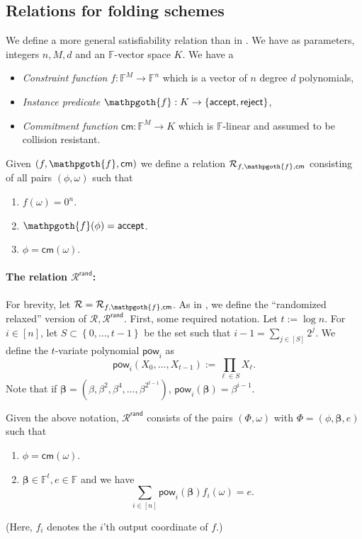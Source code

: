 \documentclass[11pt]{article} %
\newcommand{\F}{\ensuremath{\mathbb F}\xspace}
\newcommand{\cm}{\ensuremath{\mathsf{cm}}\xspace}
\newcommand{\rej}{\ensuremath{\mathsf{reject}}\xspace}
\newcommand{\acc}{\ensuremath{\mathsf{accept}}\xspace}
\newcommand{\defeq}{:=}
\newcommand{\inst}{\ensuremath{\phi}\xspace}
\newcommand{\wit}{\ensuremath{\mathsf{\omega}}\xspace}
\newcommand{\rel}{\ensuremath{\mathcal{R}}\xspace}
\newcommand{\relrand}{\ensuremath{\mathcal{R^{\mathsf{rand}}}}\xspace}
\newcommand{\set}[1]{\ensuremath{\left\{#1\right\}}\xspace}
\newcommand{\sumi}[1]{\sum_{i\in[#1]}}
\newcommand{\sumj}[1]{\sum_{j\in[#1]}}
\newcommand{\betaa}{\ensuremath{\mathbf{\boldsymbol{\beta}}}\xspace}
\newcommand{\insttbase}{\ensuremath{\Phi}\xspace}
\newcommand{\pow}{\ensuremath{\mathsf{pow}}\xspace}
\newcommand{\predinst}{\ensuremath{\mathpgoth{f}}\xspace}
\begin{document}
\subsection{Relations for folding schemes}
We define a more general satisfiability relation than in \cite{protogal}.
We have as parameters, integers $n,M,d$ and an $\F$-vector space $K$.
We have a
\begin{itemize}
 \item \emph{Constraint function} $f:\F^M\to \F^n$ which is a vector of $n$ degree $d$ polynomials,
\item \emph{Instance predicate} $\predinst:K \to \set{\acc,\rej}$,
\item \emph{Commitment function} $\cm:\F^M \to K$ which is $\F$-linear and assumed
to be collision resistant.
\end{itemize}

Given $(f,\predinst,\cm)$ we define a relation $\rel_{f,\predinst,\cm}$ consisting of all pairs
$(\inst,\wit)$ such that
\begin{enumerate}
 \item $f(\wit)=0^n$.
 \item $\predinst(\inst)=\acc$.
 \item $\inst=\cm(\wit)$.
\end{enumerate}

\paragraph{The relation $\relrand$:}
 For brevity, let $\rel=\rel_{f,\predinst,\cm}$.
  As in \cite{protogal}, we define the ``randomized relaxed'' version of $\rel, \relrand$. First, some required notation.
 Let $t\defeq \log n$. For $i\in [n]$, let $S\subset \set{0,\ldots,t-1}$ be the set such that $i-1=\sumj{S}2^j$. We define the $t$-variate polynomial $\pow_i$ as
 \[\pow_i(X_0,\ldots,X_{t-1}) \defeq \prod_{\ell\in S} X_\ell.\]
 Note that if $\betaa=(\beta,\beta^2,\beta^4,\ldots,\beta^{2^{t-1}})$, $\pow_i(\betaa)=\beta^{i-1}$.
  
  Given the above notation, $\relrand$ consists of the pairs $( \insttbase,\wit)$ with $\insttbase=(\inst,\betaa,e)$ such that
 \begin{enumerate}
  \item $\inst=\cm(\wit)$.
  \item $\betaa\in \F^t, e\in \F$ and we have 
  \[\sumi{n}\pow_{i}(\betaa) f_i(\wit) = e.\]
 \end{enumerate}
(Here, $f_i$ denotes the $i$'th output coordinate of $f$.) 
\end{document}
